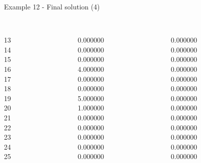\begin{frame}{Example 12 - Final solution (4)}
\footnotesize
\begin{columns}[t]
\begin{column}{0.3\textwidth}
\\
13\\
14\\
15\\
16\\
17\\
18\\
19\\
20\\
21\\
22\\
23\\
24\\
25\\
\end{column}
\begin{column}{0.3\textwidth}
\\
0.000000\\
0.000000\\
0.000000\\
4.000000\\
0.000000\\
0.000000\\
5.000000\\
1.000000\\
0.000000\\
0.000000\\
0.000000\\
0.000000\\
0.000000\\
\end{column}

\begin{column}{0.3\textwidth}
\\
0.000000\\
0.000000\\
0.000000\\
0.000000\\
0.000000\\
0.000000\\
0.000000\\
0.000000\\
0.000000\\
0.000000\\
0.000000\\
0.000000\\
0.000000\\

\end{column}
\end{columns}
\end{frame}
